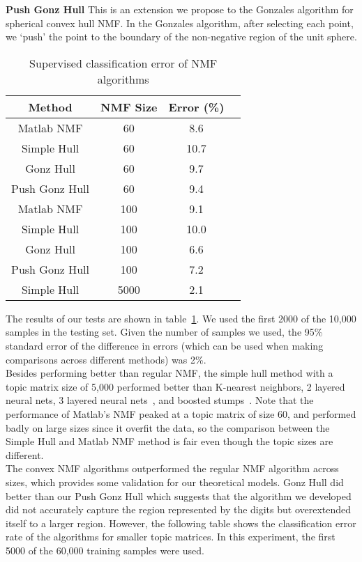\documentclass[12pt]{report}
\theoremstyle{definition}
\theoremstyle{lemma}
\theoremstyle{theorem}
\theoremstyle{corollary}
\begin{document}
\textbf{Push Gonz Hull} This is an extension we propose to the Gonzales algorithm for spherical convex hull NMF. In the Gonzales algorithm, after selecting each point, we `push' the point to the boundary of the non-negative region of the unit sphere.
\\

\begin{table}[h!]
\centering
\begin{tabular}{ |c|c|c|c| } 
 \hline
  Method & NMF Size & Error (\%) \\ 
 \hline
 Matlab NMF & 60 & 8.6 \\ 
 \hline
 Simple Hull & 60 & 10.7 \\ 
 \hline
  Gonz Hull & 60 & 9.7 \\ 
 \hline
  Push Gonz Hull & 60 & 9.4 \\ 
 \hline
  Matlab NMF & 100 & 9.1 \\ 
 \hline
 Simple Hull & 100 & 10.0 \\ 
 \hline
  Gonz Hull & 100 & 6.6 \\ 
 \hline
  Push Gonz Hull & 100 & 7.2 \\ 
 \hline
  Simple Hull & 5000 & 2.1 \\ 
 \hline
\end{tabular}
\caption{Supervised classification error of NMF algorithms}
\label{tab:main_results_table}
\end{table}

The results of our tests are shown in table~\ref{tab:main_results_table}. We used the first 2000 of the 10,000 samples in the testing set. Given the number of samples we used, the 95\% standard error of the difference in errors (which can be used when making comparisons across different methods) was 2\%. 
\\

Besides performing better than regular NMF, the simple hull method with a topic matrix size of 5,000 performed better than K-nearest neighbors, 2 layered neural nets, 3 layered neural nets~\cite{lecun}, and boosted stumps~\cite{kegl}. Note that the performance of Matlab's NMF peaked at a topic matrix of size 60, and performed badly on large sizes since it overfit the data, so the comparison between the Simple Hull and Matlab NMF method is fair even though the topic sizes are different.
\\

The convex NMF algorithms outperformed the regular NMF algorithm across sizes, which provides some validation for our theoretical models. Gonz Hull did better than our Push Gonz Hull which suggests that the algorithm we developed did not accurately capture the region represented by the digits but overextended itself to a larger region. However, the following table shows the classification error rate of the algorithms for smaller topic matrices. In this experiment, the first 5000 of the 60,000 training samples were used.
\end{document}
